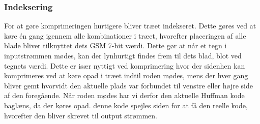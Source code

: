\subsubsection{Indeksering}
For at gøre komprimeringen hurtigere bliver træet indekseret. Dette gøres ved at køre én gang igennem alle kombinationer i træet, hvorefter placeringen af alle blade bliver tilknyttet dets GSM 7-bit værdi. Dette gør at når et tegn i inputstrømmen mødes, kan der lynhurtigt findes frem til dets blad, blot ved tegnets værdi. Dette er især nyttigt ved komprimering hvor der sidenhen kan komprimeres ved at køre opad i træet indtil roden mødes, mens der hver gang bliver gemt hvorvidt den aktuelle plads var forbundet til venstre eller højre side af den foregående. Når roden mødes har vi derfor den aktuelle Huffman kode baglæns, da der køres opad. denne kode spejles siden for at få den reelle kode, hvorefter den bliver skrevet til output strømmen.